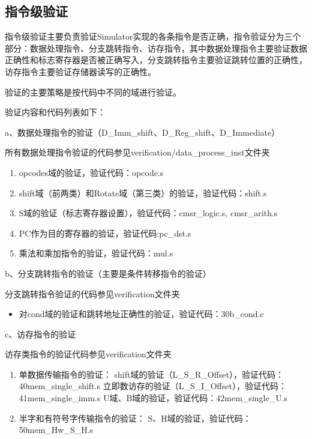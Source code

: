 \documentclass[12pt,a4paper]{article}
\begin{document}
\subsection{指令级验证}

指令级验证主要负责验证Simulator实现的各条指令是否正确，指令验证分为三个部分：数据处理指令、分支跳转指令、访存指令，其中数据处理指令主要验证数据正确性和标志寄存器是否被正确写入，分支跳转指令主要验证跳转位置的正确性，访存指令主要验证存储器读写的正确性。

验证的主要策略是按代码中不同的域进行验证。

验证内容和代码列表如下：

a、数据处理指令的验证（D\_Imm\_shift、D\_Reg\_shift、D\_Immediate）

所有数据处理指令验证的代码参见verification/data\_process\_inst文件夹

\begin{enumerate}
    \item opcodes域的验证，验证代码：opcode.s
    \item shift域（前两类）和Rotate域（第三类）的验证，验证代码：shift.s
    \item S域的验证（标志寄存器设置），验证代码：cmsr\_logic.s, cmsr\_arith.s
    \item PC作为目的寄存器的验证，验证代码:pc\_dst.s
    \item 乘法和乘加指令的验证，验证代码：mul.s
\end{enumerate}
    
b、分支跳转指令的验证（主要是条件转移指令的验证）

分支跳转指令验证的代码参见verification文件夹

\begin{itemize}
    \item 对cond域的验证和跳转地址正确性的验证，验证代码：30b\_cond.c
\end{itemize}
    
c、访存指令的验证

访存类指令的验证代码参见verification文件夹

\begin{enumerate}
    \item 单数据传输指令的验证：
    \subitem shift域的验证（L\_S\_R\_Offset），验证代码：40mem\_single\_shift.s
    \subitem 立即数访存的验证（L\_S\_I\_Offset），验证代码：41mem\_single\_imm.s
    \subitem U域、B域的验证，验证代码：42mem\_single\_U.s
    \item 半字和有符号字传输指令的验证：
    \subitem S、H域的验证，验证代码：50mem\_Hw\_S\_H.s
\end{enumerate}
\end{document}
